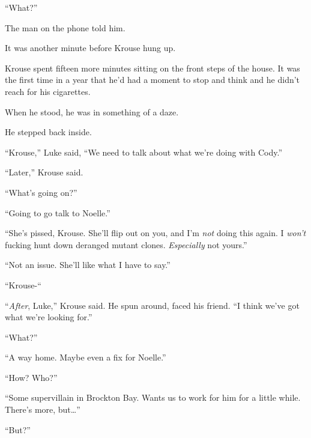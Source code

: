``What?''



The man on the phone told him.



It was another minute before Krouse hung up.



Krouse spent fifteen more minutes sitting on the front steps of the house.  It was the first time in a year that he'd had a moment to stop and think and he didn't reach for his  cigarettes.



When he stood, he was in something of a daze.



He stepped back inside.



``Krouse,'' Luke said, ``We need to talk about what we're doing with Cody.''



``Later,'' Krouse said.



``What's going on?''



``Going to go talk to Noelle.''



``She's pissed, Krouse.  She'll flip out on you, and I'm \emph{not} doing this again.  I \emph{won't} fucking hunt down deranged mutant clones.  \emph{Especially} not yours.''



``Not an issue.  She'll like what I have to say.''



``Krouse-``



``\emph{After}, Luke,'' Krouse said.  He spun around, faced his friend. ``I think we've got what we're looking for.''



``What?''



``A way home.  Maybe even a fix for Noelle.''



``How?  Who?''



``Some supervillain in Brockton Bay.  Wants us to work for him for a little while.  There's more, but\ldots''



``But?''



